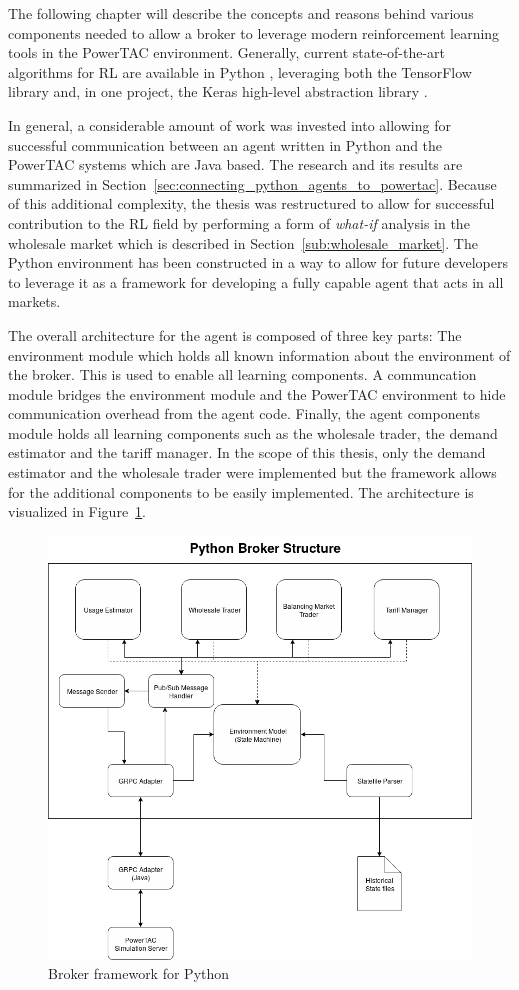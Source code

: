 The following chapter will describe the concepts and reasons behind various components needed to allow a broker to
leverage modern reinforcement learning tools in the \ac {PowerTAC} environment. Generally, current state-of-the-art
algorithms for \ac {RL} are available in Python \citep{baselines}, leveraging both the TensorFlow library and, in one
project, the Keras high-level abstraction library \citep{plappert2016kerasrl}. 

In general, a considerable amount of work was invested into allowing for successful communication between an agent
written in Python and the \ac {PowerTAC} systems which are Java based. The research and its results are summarized in
Section~\ref{sec:connecting_python_agents_to_powertac}. Because of this additional complexity, the thesis was
restructured to allow for successful contribution to the \ac {RL} field by performing a form of \emph{what-if} 
analysis in the wholesale market which is described in Section~\ref{sub:wholesale_market}. The Python environment has
been constructed in a way to allow for future developers to leverage it as a framework for developing a fully capable
agent that acts in all markets. 

The overall architecture for the agent is composed of three key parts: The environment module which holds all known
information about the environment of the broker. This is used to enable all learning components. A communcation module
bridges the environment module and the \ac {PowerTAC} environment to hide communication overhead from the agent code.
Finally, the agent components module holds all learning components such as the wholesale trader, the demand estimator
and the tariff manager. In the scope of this thesis, only the demand estimator and the wholesale trader were implemented
but the framework allows for the additional components to be easily implemented. The architecture is visualized in
Figure~\ref{fig:agentframework}. 

\begin{figure}[]
    \centering
    \includegraphics[width=0.8\linewidth]{img/Agent.png}
    \caption{Broker framework for Python}
    \label{fig:agentframework}
\end{figure}

